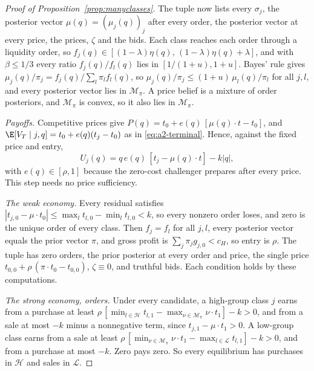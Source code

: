 \begin{proof}[Proof of Proposition~\ref{prop:manyclasses}]
The tuple now lists every \(\sigma_j\), the posterior vector \(\mu(q)=(\mu_j(q))_j\) after every order, the posterior
vector at every price, the prices, \(\zeta\) and the bids. Each class reaches each order through a liquidity order,
so \(f_j(q)\in[(1-\lambda)\eta(q),\,(1-\lambda)\eta(q)+\lambda]\), and with \(\beta\le1/3\) every ratio \(f_j(q)/f_l(q)\)
lies in \([1/(1+u),1+u]\). Bayes' rule gives \(\mu_j(q)/\pi_j=f_j(q)/\sum_l\pi_lf_l(q)\), so
\(\mu_j(q)/\pi_j\le(1+u)\,\mu_l(q)/\pi_l\) for all \(j,l\), and every posterior vector lies in \(\mathcal M_\pi\). A price
belief is a mixture of order posteriors, and \(\mathcal M_\pi\) is convex, so it also lies in \(\mathcal M_\pi\).

\emph{Payoffs.} Competitive prices give \(P(q)=t_0+e(q)\,[\mu(q)\cdot t-t_0]\), and
\(\E[V_T\mid j,q]=t_0+e(q)(t_j-t_0)\) as in \eqref{eq:a2-terminal}. Hence, against the fixed price and entry,
\[
U_j(q)=q\,e(q)\,[t_j-\mu(q)\cdot t]-k|q| ,
\]
with \(e(q)\in[\rho,1]\) because the zero-cost challenger prepares after every price. This step needs no price
sufficiency.

\emph{The weak economy.} Every residual satisfies \(|t_{j,0}-\mu\cdot t_0|\le\max_lt_{l,0}-\min_lt_{l,0}<k\), so
every nonzero order loses, and zero is the unique order of every class. Then \(f_j=f_l\) for all \(j,l\), every
posterior vector equals the prior vector \(\pi\), and gross profit is \(\sum_j\pi_jg_{j,0}<c_H\), so entry is \(\rho\).
The tuple has zero orders, the prior posterior at every order and price, the single price
\(t_{0,0}+\rho\,(\pi\cdot t_0-t_{0,0})\), \(\zeta\equiv0\), and truthful bids. Each condition holds by these
computations.

\emph{The strong economy, orders.} Under every candidate, a high-group class \(j\) earns from a purchase at least
\(\rho\,[\min_{l\in\mathcal H}t_{l,1}-\max_{\nu\in\mathcal M_\pi}\nu\cdot t_1]-k>0\), and from a sale at most \(-k\)
minus a nonnegative term, since \(t_{j,1}-\mu\cdot t_1>0\). A low-group class earns from a sale at least
\(\rho\,[\min_{\nu\in\mathcal M_\pi}\nu\cdot t_1-\max_{l\in\mathcal L}t_{l,1}]-k>0\), and from a purchase at most
\(-k\). Zero pays zero. So every equilibrium has purchases in \(\mathcal H\) and sales in \(\mathcal L\).


\end{proof}
